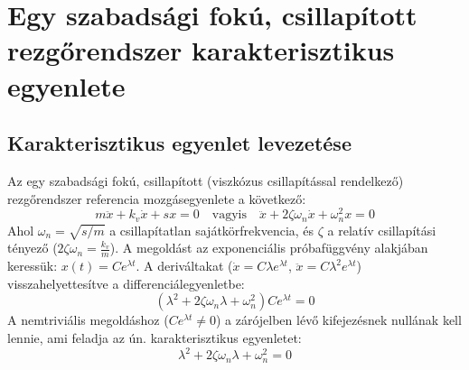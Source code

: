 \section{Egy szabadsági fokú, csillapított rezgőrendszer karakterisztikus egyenlete}

\subsection*{Karakterisztikus egyenlet levezetése}
Az egy szabadsági fokú, csillapított (viszkózus csillapítással rendelkező) rezgőrendszer referencia mozgásegyenlete a következő:
\begin{equation}
    m\ddot{x} + k_v \dot{x} + s x = 0 \quad \text{vagyis} \quad \ddot{x} + 2\zeta\omega_n \dot{x} + \omega_{n}^2 x = 0
\end{equation}
Ahol $\omega_n = \sqrt{s/m}$ a csillapítatlan sajátkörfrekvencia, és $\zeta$ a relatív csillapítási tényező ($2\zeta\omega_n = \frac{k_v}{m}$).
A megoldást az exponenciális próbafüggvény alakjában keressük: $x(t) = C e^{\lambda t}$. A deriváltakat ($\dot{x} = C \lambda e^{\lambda t}$, $\ddot{x} = C \lambda^2 e^{\lambda t}$) visszahelyettesítve a differenciálegyenletbe:
\begin{equation}
    \left( \lambda^2 + 2\zeta\omega_n \lambda + \omega_n^2 \right) C e^{\lambda t} = 0
\end{equation}
A nemtriviális megoldáshoz ($C e^{\lambda t} \neq 0$) a zárójelben lévő kifejezésnek nullának kell lennie, ami feladja az ún. karakterisztikus egyenletet:
\begin{equation}
    \lambda^2 + 2\zeta\omega_n \lambda + \omega_n^2 = 0
\end{equation}

